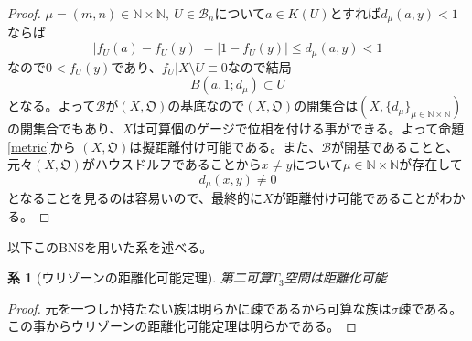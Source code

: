 \documentclass[leqno]{jsarticle}
\newtheorem{cor}[thm]{系}
\newcommand{\To}{\Longrightarrow}
\newcommand{\nn}{\mathbb{N}}
\begin{document}
\begin{proof}
$\mu=(m,n)\in \nn\times \nn,\ U\in \mathcal{B}_n$について$a\in K(U)$とすれば$d_{\mu}(a,y)<1$ならば
\[
|f_U(a)-f_U(y)|=|1-f_U(y)|\le d_{\mu}(a,y)<1
\]
なので$0<f_U(y)$であり、$f_U|X\setminus U\equiv 0$なので結局
\[
B(a,1;d_{\mu})\subset U
\]
となる。よって$\mathcal{B}$が$(X,\mathfrak{O})$の基底なので$(X,\mathfrak{O})$の開集合は$(X,\{d_{\mu}\}_{\mu\in \nn\times \nn})$の開集合でもあり、$X$は可算個のゲージで位相を付ける事ができる。よって命題\ref{metric}から
$(X,\mathfrak{O})$は擬距離付け可能である。また、$\mathcal{B}$が開基であることと、元々$(X,\mathfrak{O})$がハウスドルフであることから$x\neq y$について$\mu \in \nn\times \nn$が存在して
\[
d_{\mu}(x,y)\neq 0
\]
となることを見るのは容易いので、最終的に$X$が距離付け可能であることがわかる。
\par[$(3)\To (1)$の証明終わり]
\end{proof}

以下このBNSを用いた系を述べる。

\setcounter{equation}{0}
\begin{cor}[ウリゾーンの距離化可能定理]
第二可算$T_3$空間は距離化可能
\end{cor}
\begin{proof}
元を一つしか持たない族は明らかに疎であるから可算な族は$\sigma$疎である。この事からウリゾーンの距離化可能定理は明らかである。
\end{proof}
\end{document}
